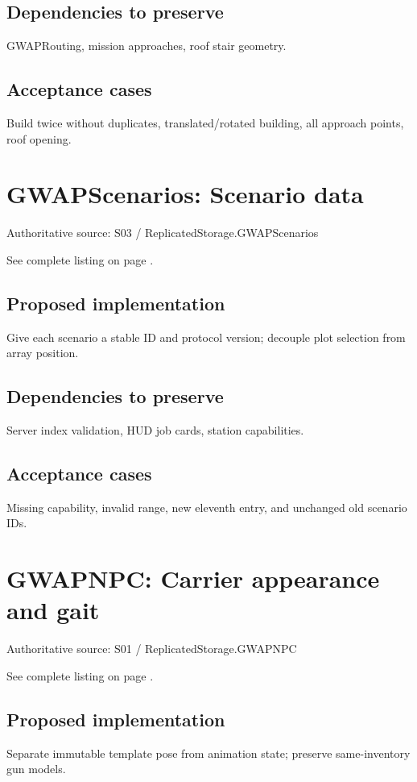 \subsection{Dependencies to preserve}
GWAPRouting, mission approaches, roof stair geometry.\allowbreak{}

\subsection{Acceptance cases}
Build twice without duplicates, translated/\allowbreak{}rotated building, all approach points, roof opening.\allowbreak{}

\section{GWAPScenarios: Scenario data}
Authoritative source: S03 /\allowbreak{} ReplicatedStorage.\allowbreak{}GWAPScenarios

See complete listing on page \pageref{src:S03}.

\subsection{Proposed implementation}
Give each scenario a stable ID and protocol version; decouple plot selection from array position.\allowbreak{}

\subsection{Dependencies to preserve}
Server index validation, HUD job cards, station capabilities.\allowbreak{}

\subsection{Acceptance cases}
Missing capability, invalid range, new eleventh entry, and unchanged old scenario IDs.\allowbreak{}

\section{GWAPNPC: Carrier appearance and gait}
Authoritative source: S01 /\allowbreak{} ReplicatedStorage.\allowbreak{}GWAPNPC

See complete listing on page \pageref{src:S01}.

\subsection{Proposed implementation}
Separate immutable template pose from animation state; preserve same-inventory gun models.\allowbreak{}

